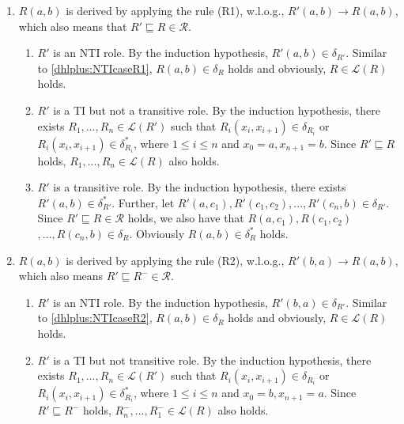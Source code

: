 \begin{enumerate}[leftmargin=12ex,label=Case~2.\arabic*, ref=Case~2.\arabic*]
\item $R(a,b)$ is derived by applying the rule (R1), w.l.o.g., $R'(a,b)\rightarrow R(a,b)$,
    which also means that $R'\sqsubseteq R\in\mathcal{R}$.

    \begin{enumerate}[leftmargin=8ex,label=Case~2.1.\arabic*]
    \item $R'$ is an NTI role. By the induction hypothesis, $R'(a,b)\in\delta_{R'}$.
        Similar to \ref{dhlplus:NTIcaseR1}, $R(a,b)\in\delta_{R}$ holds and
        obviously, $R\in\mathcal{L}(R)$ holds.

    \item $R'$ is a TI but not a transitive role.
        By the induction hypothesis, there exists $R_1,...,R_n\in\mathcal{L}(R')$
        such that $R_i(x_i,x_{i+1})\in\delta_{R_i}$ or $R_i(x_i,x_{i+1})\in\delta^*_{R_i}$, where $1\leq i\leq n$
        and $x_0=a, x_{n+1}=b$. Since $R'\sqsubseteq R$ holds, $R_1,...,R_n\in\mathcal{L}(R)$ also holds.

    \item $R'$ is a transitive role.
        By the induction hypothesis, there exists $R'(a,b)\in\delta^*_{R'}$.
        Further, let $R'(a,c_1),R'(c_1,c_2),...,R'(c_n,b)\in\delta_{R'}$.
        Since $R'\sqsubseteq R\in\mathcal{R}$ holds, we also have that
        $R(a,c_1),R(c_1,c_2)$ $,...,R(c_n,b)\in\delta_{R}$. Obviously $R(a,b)\in\delta^*_{R}$ holds.
    \end{enumerate}

\item $R(a,b)$ is derived by applying the rule (R2), w.l.o.g., $R'(b,a)\rightarrow R(a,b)$,
    which also means $R'\sqsubseteq R^-\in\mathcal{R}$.

    \begin{enumerate}[leftmargin=8ex,label=Case~2.2.\arabic*]
    \item $R'$ is an NTI role. By the induction hypothesis, $R'(b,a)\in\delta_{R'}$.
        Similar to \ref{dhlplus:NTIcaseR2}, $R(a,b)\in\delta_{R}$ holds and
        obviously, $R\in\mathcal{L}(R)$ holds.

    \item $R'$ is a TI but not transitive role. By the induction hypothesis, there exists $R_1,...,R_n\in\mathcal{L}(R')$
        such that $R_i(x_i,x_{i+1})\in\delta_{R_i}$ or $R_i(x_i,x_{i+1})\in\delta^*_{R_i}$, where $1\leq i\leq n$
        and $x_0=b, x_{n+1}=a$. Since $R'\sqsubseteq R^-$ holds, $R_n^-,...,R_1^-\in\mathcal{L}(R)$ also holds.


\end{enumerate}
\end{enumerate}
